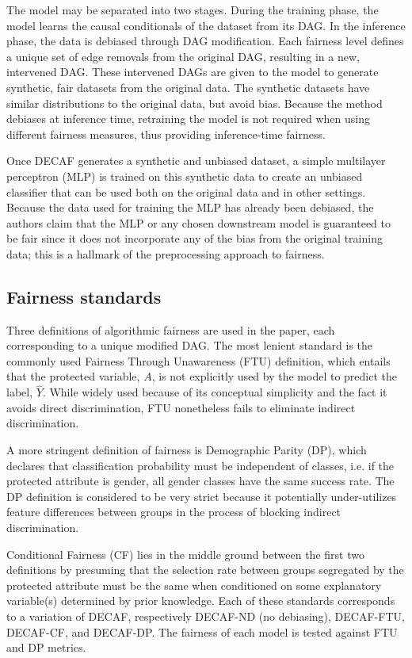 The model may be separated into two stages. During the training phase, the model learns the causal conditionals of the dataset from its DAG. In the inference phase, the data is debiased through DAG modification. Each fairness level defines a unique set of edge removals from the original DAG, resulting in a new, intervened DAG. These intervened DAGs are given to the model to generate synthetic, fair datasets from the original data. The synthetic datasets have similar distributions to the original data, but avoid bias. Because the method debiases at inference time, retraining the model is not required when using different fairness measures, thus providing inference-time fairness.

Once DECAF generates a synthetic and unbiased dataset, a simple multilayer perceptron (MLP) is trained on this synthetic data to create an unbiased classifier that can be used both on the original data and in other settings. Because the data used for training the MLP has already been debiased, the authors claim that the MLP or any chosen downstream model is guaranteed to be fair since it does not incorporate any of the bias from the original training data; this is a hallmark of the preprocessing approach to fairness.

\subsection{Fairness standards}
Three definitions of algorithmic fairness are used in the paper, each corresponding to a unique modified DAG. The most lenient standard is the commonly used Fairness Through Unawareness (FTU) definition, which entails that the protected variable, $A$, is not explicitly used by the model to predict the label, $\hat{Y}$. While widely used because of its conceptual simplicity and the fact it avoids direct discrimination, FTU nonetheless fails to eliminate indirect discrimination. 

A more stringent definition of fairness is Demographic Parity (DP), which declares that classification probability must be independent of classes, i.e. if the protected attribute is gender, all gender classes have the same success rate. The DP definition is considered to be very strict because it potentially under-utilizes feature differences between groups in the process of blocking indirect discrimination. 

Conditional Fairness (CF) lies in the middle ground between the first two definitions by presuming that the selection rate between groups segregated by the protected attribute must be the same when conditioned on some explanatory variable(s) determined by prior knowledge. Each of these standards corresponds to a variation of DECAF, respectively DECAF-ND (no debiasing), DECAF-FTU, DECAF-CF, and DECAF-DP. The fairness of each model is tested against FTU and DP metrics.

